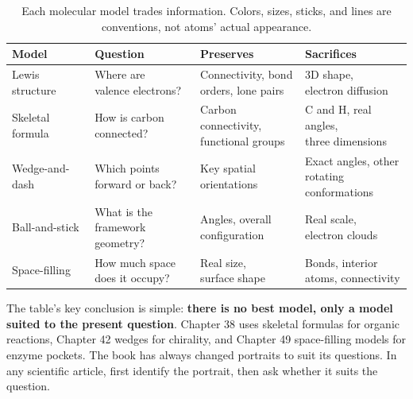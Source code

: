 \begin{table}[htbp]
\centering
\begin{tabular}{llll}
\toprule
Model & Question & Preserves & Sacrifices \\
\midrule
Lewis structure & \shortstack[l]{Where are\\valence electrons?} & \shortstack[l]{Connectivity, bond\\orders, lone pairs} & \shortstack[l]{3D shape,\\electron diffusion} \\
Skeletal formula & \shortstack[l]{How is carbon\\connected?} & \shortstack[l]{Carbon connectivity,\\functional groups} & \shortstack[l]{C and H, real angles,\\three dimensions} \\
\shortstack[l]{Wedge-and-\\dash} & \shortstack[l]{Which points\\forward or back?} & \shortstack[l]{Key spatial\\orientations} & \shortstack[l]{Exact angles, other\\rotating\\conformations} \\
Ball-and-stick & \shortstack[l]{What is the\\framework geometry?} & \shortstack[l]{Angles, overall\\configuration} & \shortstack[l]{Real scale,\\electron clouds} \\
Space-filling & \shortstack[l]{How much space\\does it occupy?} & \shortstack[l]{Real size,\\surface shape} & \shortstack[l]{Bonds, interior\\atoms, connectivity} \\
\bottomrule
\end{tabular}
\caption{Each molecular model trades information. Colors, sizes, sticks, and lines are conventions, not atoms' actual appearance.}
\end{table}

The table's key conclusion is simple: \textbf{there is no best model, only a model suited to the present question}. Chapter 38 uses skeletal formulas for organic reactions, Chapter 42 wedges for chirality, and Chapter 49 space-filling models for enzyme pockets. The book has always changed portraits to suit its questions. In any scientific article, first identify the portrait, then ask whether it suits the question.

